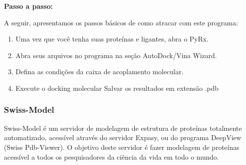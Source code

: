 \documentclass[11pt, letterpaper, portuguese]{article}
\begin{document}
    \par{\textbf{Passo a passo:}}
    \par{A seguir, apresentamos os passos básicos de como atracar com este programa:}
            \begin{enumerate}[1.]
            \item Uma vez que você tenha suas proteínas e ligantes, abra o PyRx.
            \item Abra seus arquivos no programa na seção AutoDock/Vina Wizard.
            \item Defina as condições da caixa de acoplamento molecular.
            \item Execute o docking molecular
            \iteclickve Salvar os resultados em extensão .pdb
            \end{enumerate}

        \subsubsection{Swiss-Model}
        \par Swiss-Model é um servidor de modelagem de estrutura de proteínas totalmente automatizado, acessível através do servidor Expasy, ou do programa DeepView (Swiss Pdb-Viewer). O objetivo deste servidor é fazer modelagem de proteínas acessível a todos os pesquisadores da ciência da vida em todo o mundo.
        
\end{document}
